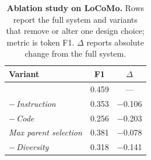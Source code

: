 \begin{table}
    \vspace{-1em}
    \centering
    \footnotesize
    \caption{\textbf{Ablation study on LoCoMo.}
    Rows report the full system and variants that remove or alter one design choice; metric is token F1.
    $\Delta$ reports absolute change from the full system.}
    \label{tab:ablation}
    \begin{tabularx}{\linewidth}{@{}>{\raggedright\arraybackslash}Xcc@{}}
        \toprule
        \rowcolor{gray!10}
        \textbf{Variant} & \textbf{F1} & \textbf{$\Delta$} \\
        \midrule
        \rowcolor{green!10}
        \sysname{}                           & 0.459  & ---      \\
        \quad \textit{$-$\,Instruction}       & 0.353  & $-$0.106 \\
        \quad \textit{$-$\,Code}              & 0.256  & $-$0.203 \\
        \quad \textit{Max parent selection}   & 0.381  & $-$0.078 \\
        \quad \textit{$-$\,Diversity}         & 0.318  & $-$0.141 \\
        \bottomrule
    \end{tabularx}%
    \vspace{-1em}
\end{table}
